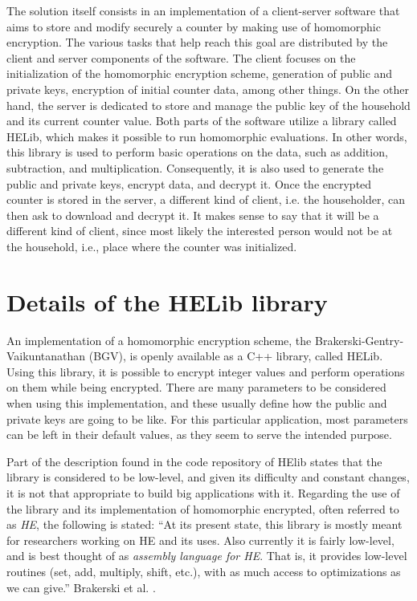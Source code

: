 The solution itself consists in an implementation of a client-server software that aims to store and modify securely a counter by making use of homomorphic encryption. The various tasks that help reach this goal are distributed by the client and server components of the software. The client focuses on the initialization of the homomorphic encryption scheme, generation of public and private keys, encryption of initial counter data, among other things. On the other hand, the server is dedicated to store and manage the public key of the household and its current counter value. Both parts of the software utilize a library called HELib, which makes it possible to run homomorphic evaluations. In other words, this library is used to perform basic operations on the data, such as addition, subtraction, and multiplication. Consequently, it is also used to generate the public and private keys, encrypt data, and decrypt it. Once the encrypted counter is stored in the server, a different kind of client, i.e. the householder, can then ask to download and decrypt it. It makes sense to say that it will be a different kind of client, since most likely the interested person would not be at the household, i.e., place where the counter was initialized.

\section{{Details of the HELib library}}

An implementation of a homomorphic encryption scheme, the Brakerski-Gentry-Vaikuntanathan (BGV), is openly available as a C++ library, called HELib. Using this library, it is possible to encrypt integer values and perform operations on them while being encrypted. There are many parameters to be considered when using this implementation, and these usually define how the public and private keys are going to be like. For this particular application, most parameters can be left in their default values, as they seem to serve the intended purpose. 

Part of the description found in the code repository of HElib states that the library is considered to be low-level, and given its difficulty and constant changes, it is not that appropriate to build big applications with it. Regarding the use of the library and its implementation of homomorphic encrypted, often referred to as \emph{HE}, the following is stated: ``At its present state, this library is mostly meant for researchers working on HE and its uses. Also currently it is fairly low-level, and is best thought of as \emph{assembly language for HE}. That is, it provides low-level routines (set, add, multiply, shift, etc.), with as much access to optimizations as we can give.'' Brakerski et al. \cite{helib}.

